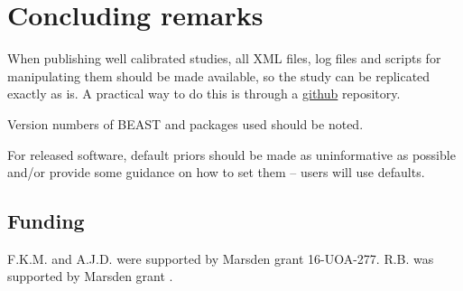 \documentclass[oneside]{article}
\begin{document}

\section*{Concluding remarks}

When publishing well calibrated studies, all XML files, log files and
scripts for manipulating them should be made available, so the study can
be replicated exactly as is. A practical way to do this is through a
\href{http://github.com}{github} repository.

Version numbers of BEAST and packages used should be noted.

For released software, default priors should be made as uninformative as 
possible and/or provide some guidance on how to set them -- users will use defaults.

\subsection*{Funding}
F.K.M. and A.J.D. were supported by Marsden grant 16-UOA-277. R.B. was
supported by Marsden grant .






\end{document}
